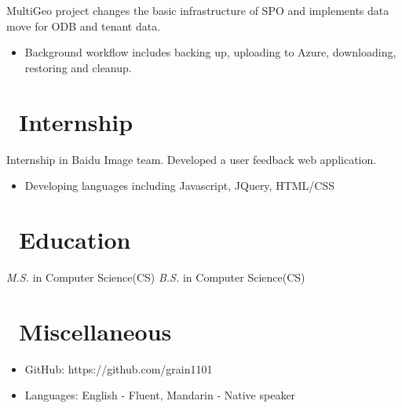 \documentclass{resume}
\begin{document}
 { }
MultiGeo project changes the basic infrastructure of SPO and implements data move for ODB and tenant data.
\begin{itemize}
  \item Background workflow includes backing up, uploading to Azure, downloading, restoring and cleanup.
\end{itemize}

\section{\faUsers\ Internship}
Internship in Baidu Image team. Developed a user feedback web application.
\begin{itemize}
\item Developing languages including Javascript, JQuery, HTML/CSS
\end{itemize}

\section{\faGraduationCap\ Education}
\textit{M.S.} in Computer Science(CS)
\textit{B.S.} in Computer Science(CS)



\section{\faInfo\ Miscellaneous}
\begin{itemize}[parsep=0.5ex]
  \item GitHub: https://github.com/grain1101
  \item Languages: English - Fluent, Mandarin - Native speaker
\end{itemize}

%
%
\end{document}
